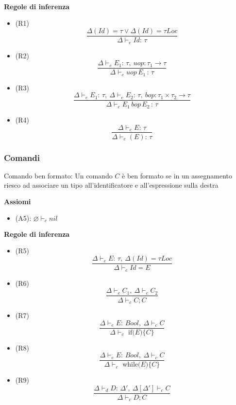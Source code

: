 \documentclass{article}
\begin{document}
\noindent\textbf{Regole di inferenza}
\begin{itemize}
    \item (R1)
          \[\frac
              {\Delta(Id) = \tau \lor \Delta(Id) = \tau Loc}
              {\Delta \vdash_e Id:\, \tau}\]

    \item (R2)
          \[\frac
              {\Delta \vdash_e E_1:\, \tau,\ uop: \tau_1 \rightarrow \tau}
              {\Delta \vdash_e uop\,E_1 \,:\, \tau}\]

    \item (R3)
          \[\frac
              {\Delta \vdash_e E_1:\, \tau,\ \Delta \vdash_e E_2:\, \tau,\ bop: \tau_1 \times \tau_2 \rightarrow \tau}
              {\Delta \vdash_e E_1\,bop\,E_2 \,:\, \tau}\]

    \item (R4)
          \[\frac{\Delta \vdash_e E:\, \tau}{\Delta \vdash_e (E):\, \tau}\]
\end{itemize}

\subsubsection{Comandi}
\begin{dfn}{Comando ben formato: }
    Un comando \(C\) è ben formato se in un assegnamento riesco ad associare un tipo all'identificatore e all'espressione sulla destra
\end{dfn}

\vspace{.2cm}

\noindent\textbf{Assiomi}
\begin{itemize}
    \item (A5): \(\varnothing \vdash_c nil\)
\end{itemize}

\noindent\textbf{Regole di inferenza}
\begin{itemize}
    \item (R5)
          \[\frac
              {\Delta \vdash_e E:\, \tau,\ \Delta(Id) = \tau Loc}
              {\Delta \vdash_c Id = E}\]

    \item (R6)
          \[\frac
              {\Delta \vdash_c C_1,\ \Delta \vdash_c C_2}
              {\Delta \vdash_c C;C}\]

    \item (R7)
          \[\frac
              {\Delta \vdash_e E:\, Bool,\ \Delta \vdash_c C}
              {\Delta \vdash_c \text{ if($E$)\{$C$\}}}\]

    \item (R8)
          \[\frac
              {\Delta \vdash_e E:\, Bool,\ \Delta \vdash_c C}
              {\Delta \vdash_c \text{ while($E$)\{$C$\}}}\]

    \item (R9)
          \[\frac
              {\Delta \vdash_d D:\, \Delta',\ \Delta[\Delta'] \vdash_c C}
              {\Delta \vdash_c D;C}\]
\end{itemize}
\end{document}
